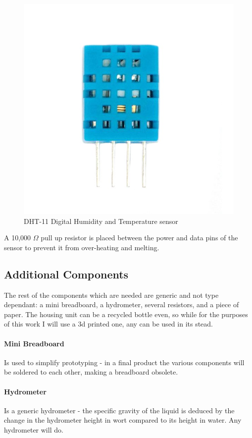 \documentclass[twoside]{ctuthesis}
\theoremstyle{plain}
\theoremstyle{definition}
\theoremstyle{note}
\begin{document}
\begin{figure}[H]
	\centering
	\includegraphics[scale=0.5]{DHT11}
	\caption{DHT-11 Digital Humidity and Temperature sensor\cite{HC-SR04}}
\end{figure}

A 10,000 $\Omega$ pull up resistor is placed between the power and data pins of the sensor to prevent it from over-heating and melting.

\subsection{Additional Components}
The rest of the components which are needed are generic and not type dependant: a mini breadboard, a hydrometer, several resistors, and a piece of paper. The housing unit can be a recycled bottle even, so while for the purposes of this work I will use a 3d printed one, any can be used in its stead.\\
\paragraph{Mini Breadboard} Is used to simplify prototyping - in a final product the various components will be soldered to each other, making a breadboard obsolete.
\paragraph{Hydrometer} Is a generic hydrometer - the specific gravity of the liquid is deduced by the change in the hydrometer height in wort compared to its height in water. Any hydrometer will do.
\end{document}
